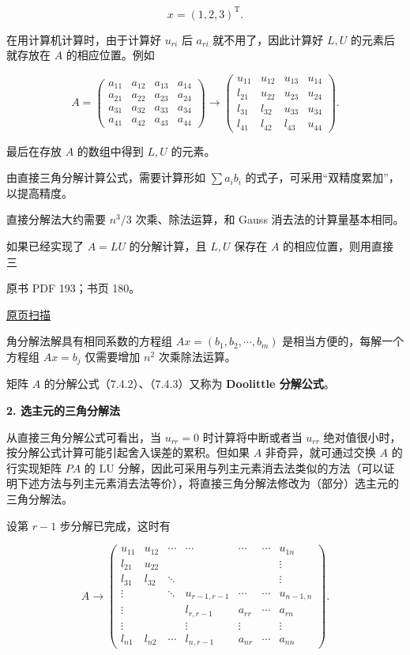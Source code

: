 \documentclass[
  10pt,
  fontset=fandol]{ctexart}
\begin{document}
\[x=(1,2,3)^{\mathrm T}.\]

在用计算机计算时，由于计算好 \(u_{ri}\) 后 \(a_{ri}\) 就不用了，因此计算好 \(L,U\) 的元素后就存放在 \(A\) 的相应位置。例如

\[
A=\begin{pmatrix}
a_{11}&a_{12}&a_{13}&a_{14}\\
a_{21}&a_{22}&a_{23}&a_{24}\\
a_{31}&a_{32}&a_{33}&a_{34}\\
a_{41}&a_{42}&a_{43}&a_{44}
\end{pmatrix}
\to\begin{pmatrix}
u_{11}&u_{12}&u_{13}&u_{14}\\
l_{21}&u_{22}&u_{23}&u_{24}\\
l_{31}&l_{32}&u_{33}&u_{34}\\
l_{41}&l_{42}&l_{43}&u_{44}
\end{pmatrix}.
\]

最后在存放 \(A\) 的数组中得到 \(L,U\) 的元素。

由直接三角分解计算公式，需要计算形如 \(\sum a_i b_i\) 的式子，可采用``双精度累加''，以提高精度。

直接分解法大约需要 \(n^3/3\) 次乘、除法运算，和 Gauss 消去法的计算量基本相同。

如果已经实现了 \(A=LU\) 的分解计算，且 \(L,U\) 保存在 \(A\) 的相应位置，则用直接三

\clearpage

原书 PDF 193；书页 180。

\href{/Users/xiangjunfeng/Desktop/数值计算专用/numerical-analysis/book/source-images/pdf-193.jpeg}{原页扫描}

角分解法解具有相同系数的方程组 \(Ax=(b_1,b_2,\cdots,b_m)\) 是相当方便的，每解一个方程组 \(Ax=b_j\) 仅需要增加 \(n^2\) 次乘除法运算。

矩阵 \(A\) 的分解公式（7.4.2）、（7.4.3）又称为 \textbf{Doolittle 分解公式}。

\textbf{2. 选主元的三角分解法}

从直接三角分解公式可看出，当 \(u_{rr}=0\) 时计算将中断或者当 \(u_{rr}\) 绝对值很小时，按分解公式计算可能引起舍入误差的累积。但如果 \(A\) 非奇异，就可通过交换 \(A\) 的行实现矩阵 \(PA\) 的 LU 分解，因此可采用与列主元素消去法类似的方法（可以证明下述方法与列主元素消去法等价），将直接三角分解法修改为（部分）选主元的三角分解法。

设第 \(r-1\) 步分解已完成，这时有

\[
A\to\begin{pmatrix}
u_{11}&u_{12}&\cdots&\cdots&\cdots&\cdots&u_{1n}\\
l_{21}&u_{22}&&&&&\vdots\\
l_{31}&l_{32}&\ddots&&&&\vdots\\
\vdots&&\ddots&u_{r-1,r-1}&\cdots&\cdots&u_{n-1,n}\\
\vdots&&&l_{r,r-1}&a_{rr}&\cdots&a_{rn}\\
\vdots&&&\vdots&\vdots&&\vdots\\
l_{n1}&l_{n2}&\cdots&l_{n,r-1}&a_{nr}&\cdots&a_{nn}
\end{pmatrix}.
\]
\end{document}
